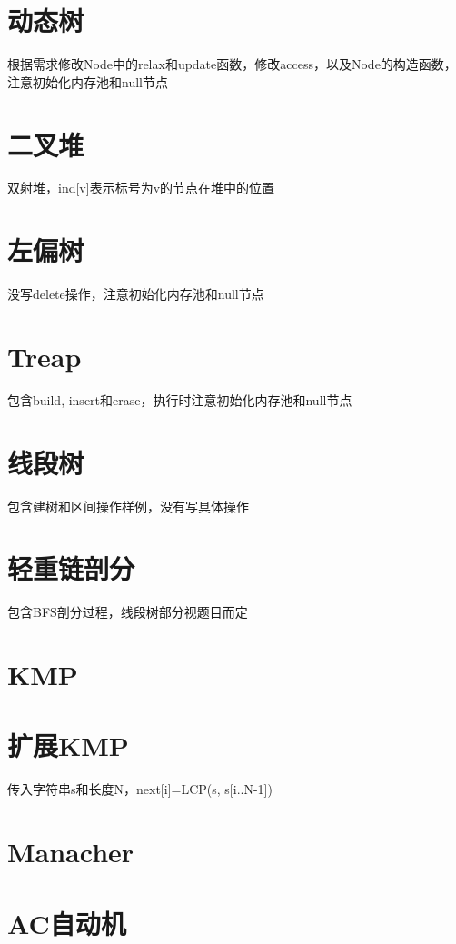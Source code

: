 \documentclass[a4paper,10pt]{book}
\begin{document}
	\section{动态树}
		根据需求修改Node中的relax和update函数，修改access，以及Node的构造函数，注意初始化内存池和null节点
		

	\section{二叉堆}
		双射堆，ind[v]表示标号为v的节点在堆中的位置
		

	\section{左偏树}
		没写delete操作，注意初始化内存池和null节点
		

	\section{Treap}
		包含build, insert和erase，执行时注意初始化内存池和null节点
		

	\section{线段树}
		包含建树和区间操作样例，没有写具体操作
		

	\section{轻重链剖分}
		包含BFS剖分过程，线段树部分视题目而定
		
	
	\section{KMP}
		
	
	\section{扩展KMP}
		传入字符串s和长度N，next[i]=LCP(s, s[i..N-1])
		
	
	\section{Manacher}
		

	\section{AC自动机}
\end{document}
